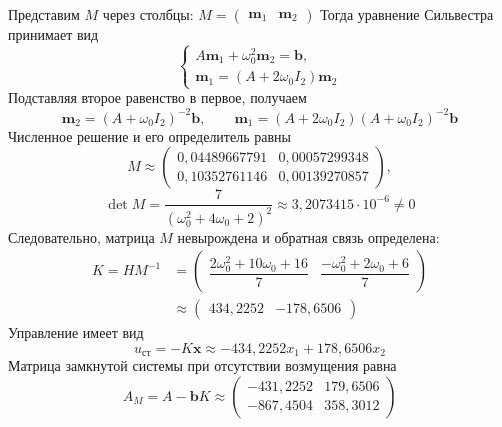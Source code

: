 Представим $M$ через столбцы: $M=\begin{pmatrix}\bm m_1&\bm m_2\end{pmatrix}$
Тогда уравнение Сильвестра принимает вид
\begin{equation}
  \begin{cases}
    A\bm m_1+\omega_0^2\bm m_2=\bm b,\\
    \bm m_1=(A+2\omega_0I_2)\bm m_2
  \end{cases}
  \label{eq:sylvester-columns}
\end{equation}
Подставляя второе равенство в первое, получаем
\begin{equation}
  \bm m_2=(A+\omega_0I_2)^{-2}\bm b,
  \qquad
  \bm m_1=(A+2\omega_0I_2)(A+\omega_0I_2)^{-2}\bm b
  \label{eq:sylvester-solution}
\end{equation}
Численное решение и его определитель равны
\begin{equation}
  M\approx
  \begin{pmatrix}
    0{,}04489667791&0{,}00057299348\\
    0{,}10352761146&0{,}00139270857
  \end{pmatrix},
  \label{eq:sylvester-numeric}
\end{equation}
\begin{equation}
  \det M=\frac{7}{(\omega_0^2+4\omega_0+2)^2}
  \approx3{,}2073415\cdot10^{-6}\ne0
  \label{eq:sylvester-determinant}
\end{equation}
Следовательно, матрица $M$ невырождена и обратная связь определена:
\begin{equation}
  \begin{aligned}
    K=HM^{-1}
    &=\begin{pmatrix}
      \dfrac{2\omega_0^2+10\omega_0+16}{7}&
      \dfrac{-\omega_0^2+2\omega_0+6}{7}
    \end{pmatrix}\\
    &\approx\begin{pmatrix}434{,}2252&-178{,}6506\end{pmatrix}
  \end{aligned}
  \label{eq:feedback-gain}
\end{equation}
Управление имеет вид
\begin{equation}
  u_{\text{ст}}=-K\bm x
  \approx-434{,}2252x_1+178{,}6506x_2
  \label{eq:stabilizing-control}
\end{equation}
Матрица замкнутой системы при отсутствии возмущения равна
\begin{equation}
  A_M=A-\bm bK\approx
  \begin{pmatrix}
    -431{,}2252&179{,}6506\\
    -867{,}4504&358{,}3012
  \end{pmatrix}
  \label{eq:closed-loop-numeric}
\end{equation}


